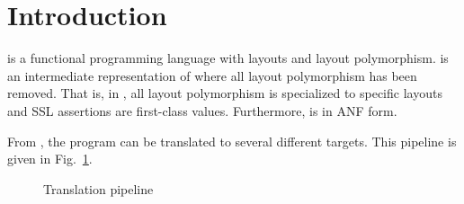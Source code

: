 \section{Introduction}

\Pika{} is a functional programming language with layouts and layout
polymorphism. \PikaCore{} is an intermediate representation of \Pika{} where all
layout polymorphism has been removed. That is, in \PikaCore, all layout
polymorphism is specialized to specific layouts and SSL assertions are
first-class values. Furthermore, \PikaCore{} is in ANF form.

From \PikaCore, the program can be translated to several different targets. This
pipeline is given in Fig.~\ref{fig:translation-pipeline}.


\begin{figure}
  
  \caption{Translation pipeline}
  \label{fig:translation-pipeline}
\end{figure}

